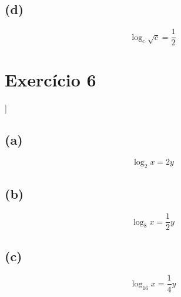 \documentclass{article}
\begin{document}
\subsection*{(d)}
\begin{equation}
	\log_c \sqrt{c} = \dfrac{1}{2} 
\end{equation}

\section{Exercício 6}]
\subsection*{(a)}
\begin{equation}
	\log_2 x = 2y
\end{equation}

\subsection*{(b)}
\begin{equation}
	\log_8 x = \dfrac{1}{2}y
\end{equation}

\subsection*{(c)}
\begin{equation}
	\log_{16} x = \dfrac{1}{4}y
\end{equation}
\end{document}
